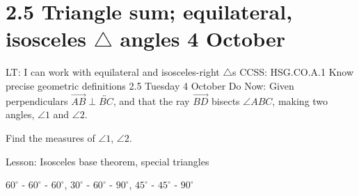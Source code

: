 \section{2.5 Triangle sum; equilateral, isosceles $\triangle$ angles \hfill 4 October}
\begin{frame}{LT: I can work with equilateral and isosceles-right $\triangle$s}
  {CCSS: HSG.CO.A.1 Know precise geometric definitions  \hfill \alert{2.5 Tuesday 4 October}}
  Do Now: Given perpendiculars $\overrightarrow{AB} \perp \overleftrightarrow{BC}$, and that the ray $\overrightarrow{BD}$ bisects $\angle ABC$, making two angles, $\angle 1$ and $\angle 2$. \par \medskip
  Find the measures of $\angle 1$, $\angle 2$.
  \begin{flushleft}
    \end{flushleft}
    Lesson: Isosceles base theorem, special triangles \par $60^\circ$ - $60^\circ$ - $60^\circ$, $30^\circ$ - $60^\circ$ - $90^\circ$, $45^\circ$ - $45^\circ$ - $90^\circ$
  \end{frame}

